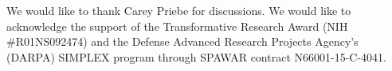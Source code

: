 \documentclass[aps,preprint,nofootinbib,floatfix]{revtex4-1}
\begin{document}


\begin{acknowledgements}
We would like to thank Carey Priebe for discussions.
We would like to acknowledge the support of the Transformative
Research Award (NIH \#R01NS092474) and  the Defense Advanced Research Projects
Agency’s (DARPA) SIMPLEX program through SPAWAR contract N66001-15-C-4041.
\end{acknowledgements}


%

\end{document}
